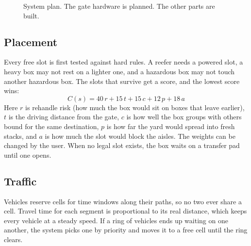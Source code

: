 \documentclass[conference]{IEEEtran}
\begin{document}
\begin{figure}[t]
\centering
{}
\caption{System plan. The gate hardware is planned. The other parts are built.}
\label{fig:arch}
\end{figure}

\subsection{Placement}
Every free slot is first tested against hard rules. A reefer needs a powered slot, a heavy box may not rest on a lighter one, and a hazardous box may not touch another hazardous box. The slots that survive get a score, and the lowest score wins:
\begin{equation}
C(s)=40\,r+15\,t+15\,c+12\,p+18\,a
\end{equation}
Here $r$ is rehandle risk (how much the box would sit on boxes that leave earlier), $t$ is the driving distance from the gate, $c$ is how well the box groups with others bound for the same destination, $p$ is how far the yard would spread into fresh stacks, and $a$ is how much the slot would block the aisles. The weights can be changed by the user. When no legal slot exists, the box waits on a transfer pad until one opens.

\subsection{Traffic}
Vehicles reserve cells for time windows along their paths, so no two ever share a cell. Travel time for each segment is proportional to its real distance, which keeps every vehicle at a steady speed. If a ring of vehicles ends up waiting on one another, the system picks one by priority and moves it to a free cell until the ring clears.
\end{document}
